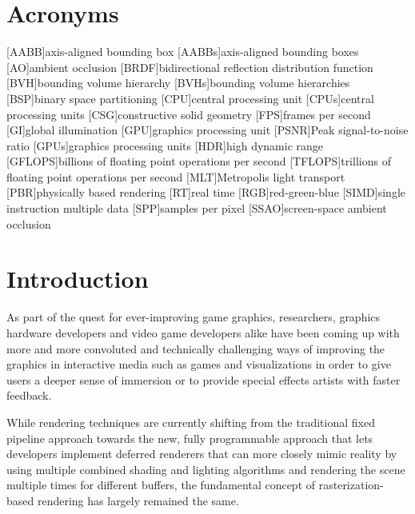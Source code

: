 \documentclass[
  twoside,
  11pt, a4paper,
  footinclude=true,
  headinclude=true,
  cleardoublepage=empty
]{scrreprt}
\begin{document}
{\small \tableofcontents}

\chapter*{Acronyms}
\begin{acronym}
    [AABB]{axis-aligned bounding box}
    [AABBs]{axis-aligned bounding boxes}
    [AO]{ambient occlusion}
    [BRDF]{bidirectional reflection distribution function}
    [BVH]{bounding volume hierarchy}
    [BVHs]{bounding volume hierarchies}
    [BSP]{binary space partitioning}
    [CPU]{central processing unit}
    [CPUs]{central processing units}
    [CSG]{constructive solid geometry}
    [FPS]{frames per second}
    [GI]{global illumination}
    [GPU]{graphics processing unit}
    [PSNR]{Peak signal-to-noise ratio}
    [GPUs]{graphics processing units}
    [HDR]{high dynamic range}
    [GFLOPS]{billions of floating point operations per second}
    [TFLOPS]{trillions of floating point operations per second}
    [MLT]{Metropolis light transport}
    [PBR]{physically based rendering}
    [RT]{real time}
    [RGB]{red-green-blue}
    [SIMD]{single instruction multiple data}
    [SPP]{samples per pixel}
    [SSAO]{screen-space ambient occlusion}
\end{acronym}

\chapter{Introduction}
\label{introduction}
As part of the quest for ever-improving game graphics, researchers, graphics hardware developers
and video game developers alike have been coming up with more and more convoluted and technically
challenging ways of improving the graphics in interactive media such as games and visualizations in
order to give users a deeper sense of immersion or to provide special effects artists with faster
feedback.

While rendering techniques are currently shifting from the traditional fixed pipeline approach
towards the new, fully programmable approach that lets developers implement deferred renderers that
can more closely mimic reality by using multiple combined shading and lighting algorithms and
rendering the scene multiple times for different buffers, the fundamental concept of
rasterization-based rendering has largely remained the same.
\end{document}
